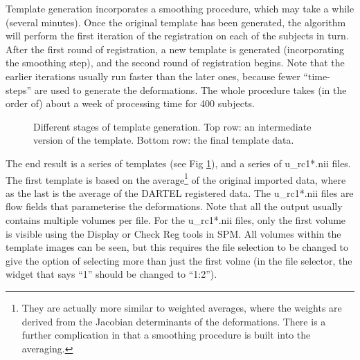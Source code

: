Template generation incorporates a smoothing procedure, which may take a while (several minutes).
Once the original template has been generated, the algorithm will perform the first iteration of the registration on each of the subjects in turn.
After the first round of registration, a new template is generated (incorporating the smoothing step), and the second round of registration begins.
Note that the earlier iterations usually run faster than the later ones, because fewer ``time-steps'' are used to generate the deformations.
The whole procedure takes (in the order of) about a week of processing time for 400 subjects.

\begin{figure}
\begin{center}
\end{center}
\caption{
Different stages of template generation.
Top row: an intermediate version of the template.
Bottom row: the final template data.
\label{Fig:sharpening}}
\end{figure}

The end result is a series of templates (see Fig \ref{Fig:sharpening}), and a series of u\_rc1*.nii files.
The first template is based on the average\footnote{They are actually more similar to weighted averages, where the weights are derived from the Jacobian determinants of the deformations. There is a further complication in that a smoothing procedure is built into the averaging.} of the original imported data, where as the last is the average of the DARTEL registered data.
The u\_rc1*.nii files are flow fields that parameterise the deformations.
Note that all the output usually contains multiple volumes per file.
For the u\_rc1*.nii files, only the first volume is visible using the Display or Check Reg tools in SPM.
All volumes within the template images can be seen, but this requires the file selection to be changed to give the option of selecting more than just the first volme (in the file selector, the widget that says ``1'' should be changed to ``1:2'').

